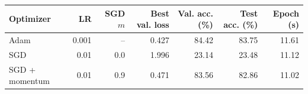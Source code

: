 \begin{tabular}{lrrrrrr}
\hline
Optimizer & LR & SGD $m$ & Best val. loss & Val. acc. (\%) & Test acc. (\%) & Epoch (s) \\
\hline
Adam & 0.001 & -- & 0.427 & 84.42 & 83.75 & 11.61 \\
SGD & 0.01 & 0.0 & 1.996 & 23.14 & 23.48 & 11.12 \\
SGD + momentum & 0.01 & 0.9 & 0.471 & 83.56 & 82.86 & 11.02 \\
\hline
\end{tabular}
